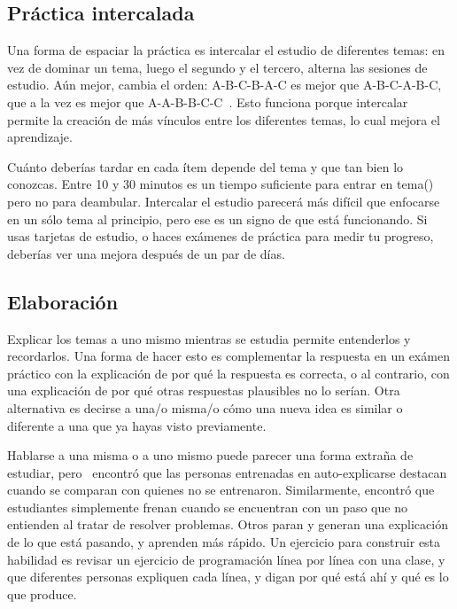 \subsection*{Práctica intercalada}

Una forma de espaciar la práctica es intercalar el estudio de diferentes temas:
en vez de dominar un tema,
luego el segundo y el tercero,
alterna las sesiones de estudio.
Aún mejor,
cambia el orden:
A-B-C-B-A-C es mejor que A-B-C-A-B-C,
que a la vez es mejor que A-A-B-B-C-C~\cite{Rohr2015}.
Esto funciona porque intercalar permite la creación de más vínculos entre los diferentes temas,
lo cual mejora el aprendizaje.

Cuánto deberías tardar en cada ítem
depende del tema y que tan bien lo conozcas.
Entre 10 y 30 minutos es un tiempo suficiente para
entrar en tema()
pero no para deambular.
Intercalar el estudio parecerá más difícil que enfocarse en un sólo tema al principio,
pero ese es un signo de que está funcionando.
Si usas tarjetas de estudio, o haces exámenes de práctica para medir tu progreso,
deberías ver una mejora después de un par de días.

\subsection*{Elaboración}

Explicar los temas a uno mismo mientras se estudia
permite entenderlos y recordarlos.
Una forma de hacer esto es complementar la respuesta en un exámen práctico
con la explicación de por qué la respuesta es correcta,
o al contrario, con una explicación de por qué otras respuestas plausibles no lo serían.
Otra alternativa es decirse a una/o misma/o
cómo una nueva idea es similar o diferente a una que ya hayas visto previamente.

Hablarse a una misma o a uno mismo puede parecer una forma extraña de estudiar,
pero~\cite{Biel1995} encontró que
las personas entrenadas en auto-explicarse destacan cuando se comparan con quienes no se entrenaron.
Similarmente,
\cite{Chi1989} encontró que estudiantes simplemente frenan cuando se encuentran con un paso que no entienden
al tratar de resolver problemas.
Otros paran y generan una explicación de lo que está pasando,
y aprenden más rápido.
Un ejercicio para construir esta habilidad es revisar un ejercicio de programación línea por línea con una clase,
y que diferentes personas expliquen cada línea,
y digan por qué está ahí y qué es lo que produce.

